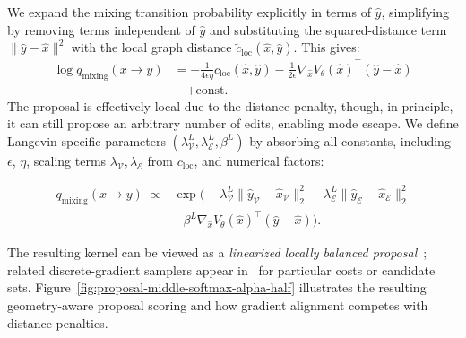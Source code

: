 We expand the mixing transition probability explicitly in terms of $\hat{y}$, simplifying by removing terms independent of $\hat{y}$ and substituting the squared-distance term $\|\hat{y}-\hat{x}\|^2$ with the local graph distance $\tilde{c}_{\mathrm{loc}}(\hat{x}, \hat{y})$. This gives:
\begin{align}
\log q_\mathrm{mixing}(x\to y)
&= -\frac{1}{4\epsilon\eta}\tilde{c}_{\mathrm{loc}}(\hat{x}, \hat{y}) 
- \frac{1}{2\epsilon}\nabla_{\hat{x}} V_\theta(\hat{x})^\top(\hat{y}-\hat{x}) \nonumber\\
&\quad + \text{const.}\label{eq:mixing-transition}
\end{align}
The proposal is effectively local due to the distance penalty, though, in principle, it can still propose an arbitrary number of edits, enabling mode escape. We define Langevin-specific parameters $(\lambda_{\mathcal{V}}^L, \lambda_{\mathcal{E}}^L, \beta^L)$ by absorbing all constants, including $\epsilon$, $\eta$, scaling terms $\lambda_{\mathcal{V}}, \lambda_{\mathcal{E}}$ from $c_{\mathrm{loc}}$, and numerical factors: 
\addtocounter{equation}{1}\begin{align}
q_\mathrm{mixing}(x\to y)
\;\propto&\exp\!\bigl(
- \lambda_{\mathcal{V}}^L\|\hat{y}_{\mathcal{V}}-\hat{x}_{\mathcal{V}}\|_2^2
 - \lambda_{\mathcal{E}}^L\|\hat{y}_{\mathcal{E}}-\hat{x}_{\mathcal{E}}\|_2^2
\nonumber\\
&- \beta^L\nabla_{\hat{x}} V_\theta(\hat{x})^\top(\hat{y}-\hat{x})
\bigr).\tag{\theequation}
\end{align}


The resulting kernel can be viewed as a \emph{linearized locally balanced proposal}~\citep{zanella2020informed}; related
discrete-gradient samplers appear in~\citep{grathwohl2021oops,zhang2022langevin} for particular costs or candidate sets.
Figure~\ref{fig:proposal-middle-softmax-alpha-half} illustrates the resulting geometry-aware proposal
scoring and how gradient alignment competes with distance penalties.

